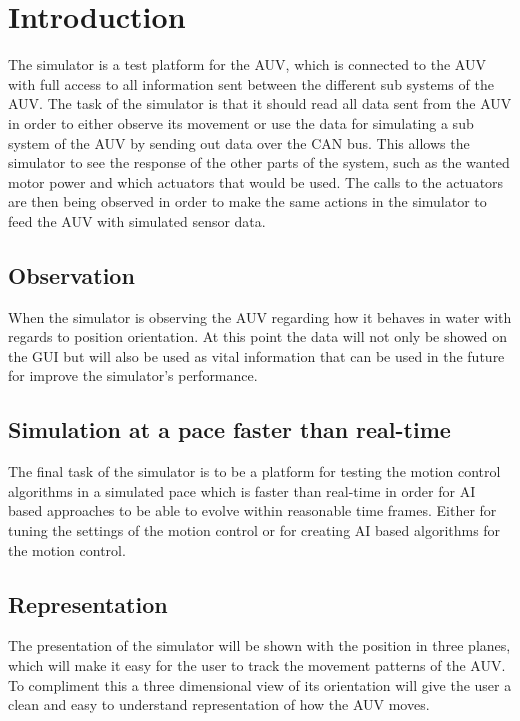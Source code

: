\section{Introduction}\label{sec:introduction}
The simulator is a test platform for the AUV, which is connected to the AUV with full access to all information sent between the different sub systems of the AUV. The task of the simulator is that it should read all data sent from the AUV in order to either observe its movement or use the data for simulating a sub system of the AUV by sending out data over the CAN bus. This allows the simulator to see the response of the other parts of the system, such as the wanted motor power and which actuators that would be used. The calls to the actuators are then being observed in order to make the same actions in the simulator to feed the AUV with simulated sensor data.

\subsection{Observation}
When the simulator is observing the AUV regarding how it behaves in water with regards to position orientation. At this point the data will not only be showed on the GUI but will also be used as vital information that can be used in the future for improve the simulator's performance.

\subsection{Simulation at a pace faster than real-time}
The final task of the simulator is to be a platform for testing the motion control algorithms in a simulated pace which is faster than real-time in order for AI based approaches to be able to evolve within reasonable time frames. Either for tuning the settings of the motion control or for creating AI based algorithms for the motion control.

\subsection{Representation}
The presentation of the simulator will be shown with the position in three planes, which will make it easy for the user to track the movement patterns of the AUV. To compliment this a three dimensional view of its orientation will give the user a clean and easy to understand representation of how the AUV moves.